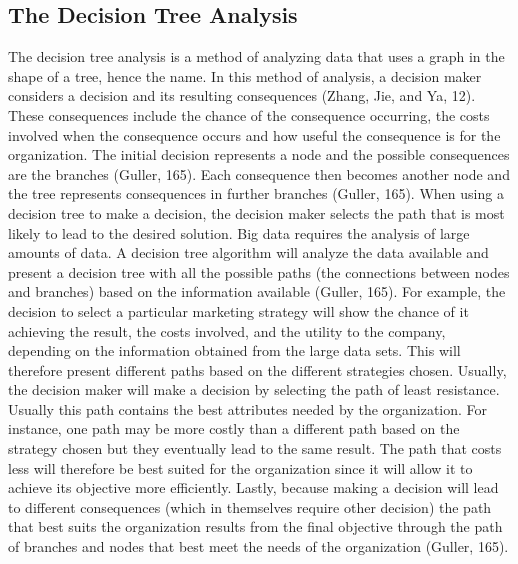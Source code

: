 \documentclass[sigconf]{acmart}
\begin{document}
\subsection{The Decision Tree Analysis}
The decision tree analysis is a method of analyzing data that uses a graph in the shape of a tree, hence the name. In this method of analysis, a decision maker considers a decision and its resulting consequences (Zhang, Jie, and Ya, 12). These consequences include the chance of the consequence occurring, the costs involved when the consequence occurs and how useful the consequence is for the organization. The initial decision represents a node and the possible consequences are the branches (Guller, 165). Each consequence then becomes another node and the tree represents consequences in further branches (Guller, 165). When using a decision tree to make a decision, the decision maker selects the path that is most likely to lead to the desired solution. Big data requires the analysis of large amounts of data. A decision tree algorithm will analyze the data available and present a decision tree with all the possible paths (the connections between nodes and branches) based on the information available (Guller, 165). 
For example, the decision to select a particular marketing strategy will show the chance of it achieving the result, the costs involved, and the utility to the company, depending on the information obtained from the large data sets. This will therefore present different paths based on the different strategies chosen. Usually, the decision maker will make a decision by selecting the path of least resistance. Usually this path contains the best attributes needed by the organization. For instance, one path may be more costly than a different path based on the strategy chosen but they eventually lead to the same result. The path that costs less will therefore be best suited for the organization since it will allow it to achieve its objective more efficiently. Lastly, because making a decision will lead to different consequences (which in themselves require other decision) the path that best suits the organization results from the final objective through the path of branches and nodes that best meet the needs of the organization (Guller, 165).
\end{document}
